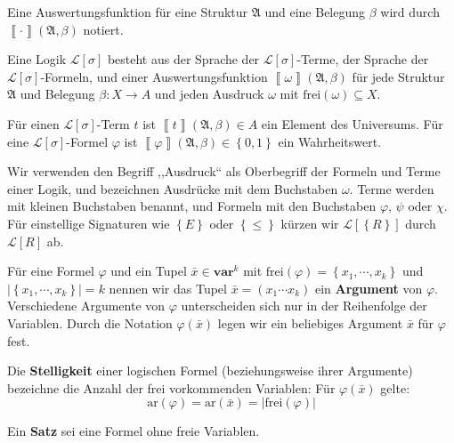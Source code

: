 Eine Auswertungsfunktion für eine Struktur $\mathfrak{A}$ und eine
Belegung $\beta$ wird durch $\left\llbracket \cdot\right\rrbracket \left(\mathfrak{A},\beta\right)$
notiert.
\begin{defn}
Eine Logik $\mathcal{L}\left[\sigma\right]$ besteht aus der Sprache
der $\mathcal{L}\left[\sigma\right]$-Terme, der Sprache der $\mathcal{L}\left[\sigma\right]$-Formeln,
und einer Auswertungsfunktion $\left\llbracket \omega\right\rrbracket \left(\mathfrak{A},\beta\right)$
für jede Struktur $\mathfrak{A}$ und Belegung $\beta:X\rightarrow A$
und jeden Ausdruck $\omega$ mit $\mathrm{frei}\left(\omega\right)\subseteq X$.

Für einen $\mathcal{L}\left[\sigma\right]$-Term $t$ ist $\left\llbracket t\right\rrbracket \left(\mathfrak{A},\beta\right)\in A$
ein Element des Universums. Für eine $\mathcal{L}\left[\sigma\right]$-Formel
$\varphi$ ist $\left\llbracket \varphi\right\rrbracket \left(\mathfrak{A},\beta\right)\in\left\{ 0,1\right\} $
ein Wahrheitswert.
\end{defn}
\begin{notation}
Wir verwenden den Begriff ,,Ausdruck`` als Oberbegriff der Formeln
und Terme einer Logik, und bezeichnen Ausdrücke mit dem Buchstaben
$\omega$. Terme werden mit kleinen Buchstaben benannt, und Formeln
mit den Buchstaben $\varphi$, $\psi$ oder $\chi$. Für einstellige
Signaturen wie $\left\{ E\right\} $ oder $\left\{ \leqslant\right\} $
kürzen wir $\mathcal{L}\left[\left\{ R\right\} \right]$ durch $\mathcal{L}\left[R\right]$
ab.
\end{notation}
\begin{defn}
Für eine Formel $\varphi$ und ein Tupel $\bar{x}\in\mathbf{var}^{k}$
mit $\mathrm{frei}\left(\varphi\right)=\left\{ x_{1},\cdots,x_{k}\right\} $
und $\left|\left\{ x_{1},\cdots,x_{k}\right\} \right|=k$ nennen wir
das Tupel $\bar{x}=\left(x_{1}\cdots x_{k}\right)$ ein \textbf{Argument
}von $\varphi$. Verschiedene Argumente von $\varphi$ unterscheiden
sich nur in der Reihenfolge der Variablen. Durch die Notation $\varphi\left(\bar{x}\right)$
legen wir ein beliebiges Argument $\bar{x}$ für $\varphi$ fest.

Die \textbf{Stelligkeit }einer logischen Formel (beziehungsweise ihrer
Argumente) bezeichne die Anzahl der frei vorkommenden Variablen: Für
$\varphi\left(\bar{x}\right)$ gelte: 
\[
\mathrm{ar}\left(\varphi\right)=\mathrm{ar}\left(\bar{x}\right)=\left|\mathrm{frei}\left(\varphi\right)\right|
\]

Ein \textbf{Satz} sei eine Formel ohne freie Variablen.
\end{defn}
